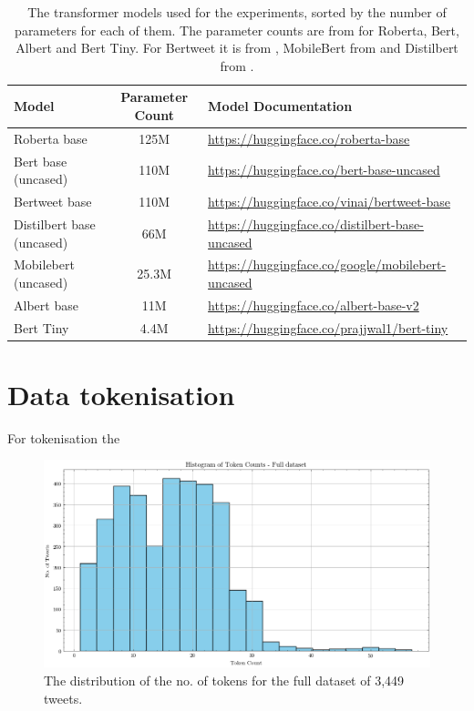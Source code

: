 \begin{table}[ht]
    \captionsetup{font=small}
    \centering
    \begin{tabularx}{\textwidth}{|l|c|X|}
        \hline
        \rowcolor[gray]{0.7}
        \textbf{Model} & \textbf{Parameter Count} & \textbf{Model Documentation} \\
        \hline
        Roberta base & 125M & \small{\url{https://huggingface.co/roberta-base}} \\
        \hline 
        Bert base (uncased) & 110M & \small{\url{https://huggingface.co/bert-base-uncased}} \\
        \hline
        Bertweet base & 110M & \small{\url{https://huggingface.co/vinai/bertweet-base}} \\
        \hline
        Distilbert base (uncased) & 66M & \small{\url{https://huggingface.co/distilbert-base-uncased}} \\
        \hline
        Mobilebert (uncased) & 25.3M & \small{\url{https://huggingface.co/google/mobilebert-uncased}} \\
        \hline
        Albert base & 11M & \small{\url{https://huggingface.co/albert-base-v2}} \\
        \hline
        Bert Tiny & 4.4M & \small{\url{https://huggingface.co/prajjwal1/bert-tiny}} \\
        \hline
    \end{tabularx}
    \caption{The transformer models used for the experiments, sorted by the number of parameters for each of them. The parameter counts are from \cite{bhargavaGeneralizationNLIWays2021} for Roberta, Bert, Albert and Bert Tiny. For Bertweet it is from \cite{nguyenBERTweetPretrainedLanguage2020}, MobileBert from \cite{sunMobileBERTCompactTaskAgnostic2020} and Distilbert from \cite{sanhDistilBERTDistilledVersion2020}.}    
    \label{tab: model_dtls}
\end{table} 

\section{Data tokenisation}
For tokenisation the 
\begin{figure}
    \centering
    \includegraphics[width=\textwidth]{figures/token_hist.png} %
    \caption{The distribution of the no. of tokens for the full dataset of 3,449 tweets.}
    \label{fig: token_hist}
\end{figure}
